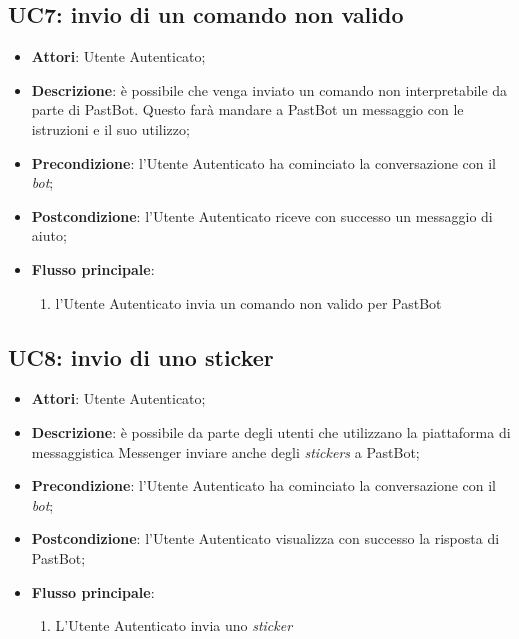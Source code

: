 
\subsection{UC7: invio di un comando non valido}
\label{uc:uc7}
\hypertarget{UC7}{}

\begin{itemize}
  \item \textbf{Attori}: Utente Autenticato;
  \item \textbf{Descrizione}: è possibile che venga inviato un comando non
interpretabile da parte di PastBot. Questo farà mandare a PastBot un messaggio
con le istruzioni e il suo utilizzo;
  \item \textbf{Precondizione}: l'Utente Autenticato ha cominciato la
conversazione con il \textit{bot};
  \item \textbf{Postcondizione}: l'Utente Autenticato riceve con successo un
messaggio di aiuto;
  \item \textbf{Flusso principale}:
  \begin{enumerate}
    \item l'Utente Autenticato invia un comando non valido per PastBot
  \end{enumerate}
\end{itemize}



\subsection{UC8: invio di uno sticker}
\label{uc:uc8}
\hypertarget{UC8}{}

\begin{itemize}
  \item \textbf{Attori}: Utente Autenticato;
  \item \textbf{Descrizione}: è possibile da parte degli utenti che utilizzano
la piattaforma di messaggistica Messenger inviare anche degli \textit{stickers}
a PastBot;
  \item \textbf{Precondizione}: l'Utente Autenticato ha cominciato la
conversazione con il \textit{bot};
  \item \textbf{Postcondizione}: l'Utente Autenticato visualizza con successo
la risposta di PastBot;
  \item \textbf{Flusso principale}:
  \begin{enumerate}
    \item L'Utente Autenticato invia uno \textit{sticker}
  \end{enumerate}
\end{itemize}


